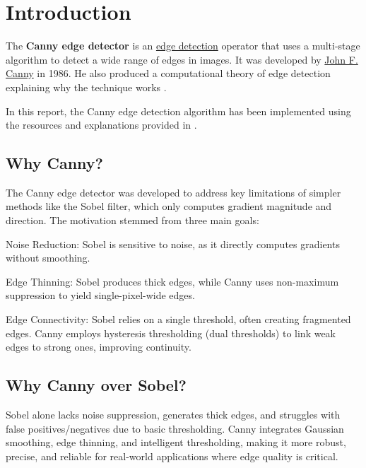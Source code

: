 \section{Introduction}
\label{sec:introduction}

The \textbf{Canny edge detector} is an \href{https://en.wikipedia.org/wiki/Edge_detection}{edge detection} operator that uses a multi-stage algorithm to detect a wide range of edges in images. It was developed by \href{https://en.wikipedia.org/wiki/John_F._Canny}{John F. Canny} in 1986. He also produced a computational theory of edge detection explaining why the technique works \cite{wikipedia_canny}.

In this report, the Canny edge detection algorithm has been implemented using the resources and explanations provided in \cite{gonzalez2008, medium_canny, sriram_canny, wikipedia_canny}.

\subsection{Why Canny?}
\label{sec:why-canny}
The Canny edge detector was developed to address key limitations of simpler methods like the Sobel filter, which only computes gradient magnitude and direction. The motivation stemmed from three main goals:

Noise Reduction: Sobel is sensitive to noise, as it directly computes gradients without smoothing.

Edge Thinning: Sobel produces thick edges, while Canny uses non-maximum suppression to yield single-pixel-wide edges.

Edge Connectivity: Sobel relies on a single threshold, often creating fragmented edges. Canny employs hysteresis thresholding (dual thresholds) to link weak edges to strong ones, improving continuity.

\subsection{Why Canny over Sobel?}
\label{sec:why-canny-over-sobel}

Sobel alone lacks noise suppression, generates thick edges, and struggles with false positives/negatives due to basic thresholding. Canny integrates Gaussian smoothing, edge thinning, and intelligent thresholding, making it more robust, precise, and reliable for real-world applications where edge quality is critical.


